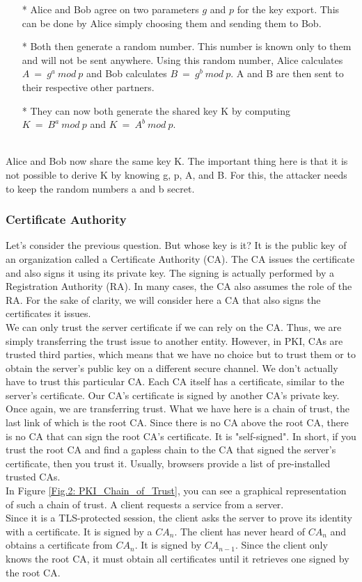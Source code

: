 \begin{enumerate}[]
    \item[*] Alice and Bob agree on two parameters $g$ and $p$ for the key export. This can be done by Alice simply choosing them and sending them to Bob.
    \item[*] Both then generate a random number. This number is known only to them and will not be sent anywhere. Using this random number, Alice calculates $A \ = \ g^a \ mod \ p$ and Bob calculates $B \ = \ g^b \ mod \ p$. A and B are then sent to their respective other partners.
    \item[*] They can now both generate the shared key K by computing $K \ = \ B^a \ mod \ p$ and $K \ = \ A^b \ mod \ p$.
    \end{enumerate}
\\
Alice and Bob now share the same key K. The important thing here is that it is not possible 
to derive K by knowing g, p, A, and B. For this, the attacker needs to keep the random numbers 
a and b secret.

\subsubsection{Certiﬁcate Authority}\cite{b38}
Let's consider the previous question. But whose key is it? It is the public key of an 
organization called a Certificate Authority (CA). The CA issues the certificate and 
also signs it using its private key. The signing is actually performed by a 
Registration Authority (RA). In many cases, the CA also assumes the role of the RA. 
For the sake of clarity, we will consider here a CA that also signs the certificates 
it issues.
\\
We can only trust the server certificate if we can rely on the CA. Thus, we are 
simply transferring the trust issue to another entity. However, in PKI, CAs are 
trusted third parties, which means that we have no choice but to trust them or to 
obtain the server's public key on a different secure channel. We don't actually have 
to trust this particular CA. Each CA itself has a certificate, similar to the server's 
certificate. Our CA's certificate is signed by another CA's private key. Once again, 
we are transferring trust. What we have here is a chain of trust, the last link of which 
is the root CA. Since there is no CA above the root CA, there is no CA that can sign 
the root CA's certificate. It is "self-signed". In short, if you trust the root CA and 
find a gapless chain to the CA that signed the server's certificate, then you trust it. 
Usually, browsers provide a list of pre-installed trusted CAs.
\\
In Figure \ref{Fig.2: PKI_Chain_of_Trust}, you can see a graphical representation of 
such a chain of trust. A client requests a service from a server.
\\
Since it is a TLS-protected session, the client asks the server to prove its identity 
with a certificate. It is signed by a $CA_n$. The client has never heard of $CA_n$ and obtains 
a certificate from $CA_n$. It is signed by $CA_{n-1}$. Since the client only knows the root CA, 
it must obtain all certificates until it retrieves one signed by the root CA.

